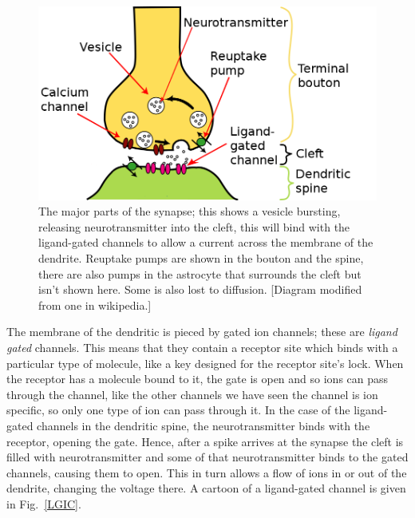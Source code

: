 \documentclass[11pt,a4paper]{scrartcl}
\begin{document}
\begin{figure}
\begin{center}
\includegraphics[width=12cm]{Synapse.png}
\end{center}
\caption{The major parts of the synapse; this shows a vesicle
  bursting, releasing neurotransmitter into the cleft, this will bind
  with the ligand-gated channels to allow a current across the
  membrane of the dendrite. Reuptake pumps are shown in the bouton and
  the spine, there are also pumps in the astrocyte that surrounds the
  cleft but isn't shown here. Some is also lost to diffusion. [Diagram
    modified from one in wikipedia.]}
\end{figure}

The membrane of the dendritic is pieced by gated ion channels; these
are \textsl{ligand gated} channels. This means that they contain a
receptor site which binds with a particular type of molecule, like a
key designed for the receptor site's lock. When the receptor has a
molecule bound to it, the gate is open and so ions can pass through
the channel, like the other channels we have seen the channel is ion
specific, so only one type of ion can pass through it. In the case of
the ligand-gated channels in the dendritic spine, the neurotransmitter
binds with the receptor, opening the gate. Hence, after a spike
arrives at the synapse the cleft is filled with neurotransmitter and
some of that neurotransmitter binds to the gated channels, causing
them to open. This in turn allows a flow of ions in or out of the
dendrite, changing the voltage there. A cartoon of a ligand-gated
channel is given in Fig.~\ref{LGIC}.
\end{document}
